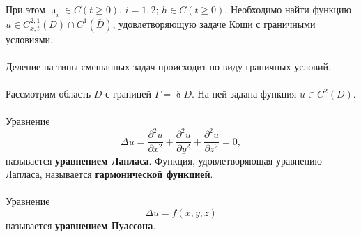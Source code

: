 \documentclass[a4paper, 12pt]{report}
\numberwithin{equation}{section}
\renewcommand{\geq}{\geqslant}
\renewcommand{\delta}{\updelta}
\renewcommand{\mu}{\upmu}
\newcommand{\pderivt}[2]{\frac{\partial^2 #1}{\partial #2^2}}
\begin{document}
	При этом $\mu_i\in C(t\geq 0)$, $i=1,2$; $h\in C(t\geq 0)$. Необходимо найти функцию
	$u\in C_{x,t}^{2,1}(D)\cap C^1(\overline{D})$, удовлетворяющую задаче Коши с граничными условиями.
	\\\\
	Деление на типы смешанных задач происходит по виду граничных условий.
	\\\\
	Рассмотрим область $D$ с границей $\Gamma  = \delta D$. На ней задана функция $u \in C^2(D)$. 
	\\\\
	Уравнение 
	\begin{equation}
		\Delta u = \pderivt{u}{x} + \pderivt{u}{y} + \pderivt{u}{z} = 0,
	\end{equation}
	называется \textbf{уравнением Лапласа}. Функция, удовлетворяющая уравнению Лапласа, называется \textbf{гармонической функцией}.\\\\
	Уравнение \begin{equation}
		\Delta u = f(x,y,z)
	\end{equation}
	называется \textbf{уравнением Пуассона}.
	
\end{document}
